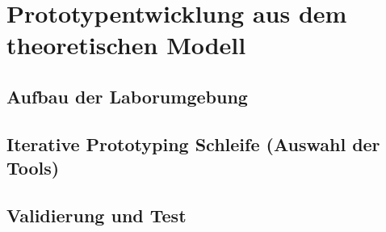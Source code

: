 \newpage
\section{Prototypentwicklung aus dem theoretischen Modell}\label{lab:prototyp}
\subsection{Aufbau der Laborumgebung}
\subsection{Iterative Prototyping Schleife (Auswahl der Tools)}
\subsection{Validierung und Test}
